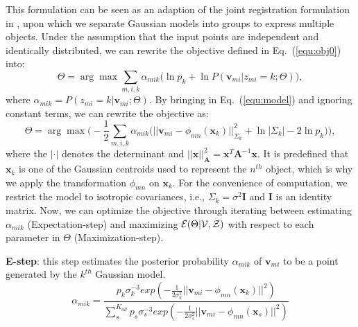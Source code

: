 This formulation can be seen as an adaption of the joint registration formulation in \cite{Evangelidis2014}, upon which we separate Gaussian models into groups to express multiple objects. 
%
%
Under the assumption that the input points are independent and identically distributed, we can rewrite the objective defined in Eq.~(\ref{equ:obj0}) into:
%
\begin{equation} \label{equ:obj2}
\Theta=\arg\max\sum_{m,i,k}\alpha_{mik}\big(\ln p_k + \ln P(\mathbf{v}_{mi}|z_{mi}=k;\Theta)\big),
\end{equation}
%
where $\alpha_{mik} = P( z_{mi} = k | \mathbf{v}_{mi} ; \Theta )$.
%
By bringing in Eq.~(\ref{equ:model}) and ignoring constant terms, we can rewrite the objective as:
\begin{equation}
\label{equ:obj3}
\Theta=\arg\max\Big(-\frac{1}{2}\sum_{m,i,k}\alpha_{mik}\big(||\mathbf{v}_{mi}-\phi_{mn}(\mathbf{x}_k)||_{\Sigma_k}^2 + \ln |\Sigma_k| - 2\ln p_k\big)\Big), 
\end{equation}
%
where the $|\cdot|$ denotes the determinant and $||\mathbf{x}||_{\mathbf{A}}^2= \mathbf{x}^T\mathbf{A}^{-1}\mathbf{x}$. 
%
It is predefined that $\mathbf{x}_k$ is one of the Gaussian centroids used to represent the $n^{th}$ object, which is why we apply the transformation $\phi_{mn}$ on $\mathbf{x}_k$. 
%
For the convenience of computation, we restrict the model to isotropic covariances, i.e., $\Sigma_k=\sigma^2\mathbf{I}$ and $\mathbf{I}$ is an identity matrix.
%
Now, we can optimize the objective through iterating between estimating $\alpha_{mik}$ (Expectation-step) and maximizing $\mathcal{E}(\Theta|\mathcal{V},\mathcal{Z})$ with respect to each parameter in $\Theta$ (Maximization-step).

\noindent\textbf{E-step}:
this step estimates the posterior probability $\alpha_{mik}$ of $\mathbf v_{mi}$ to be a point generated by the $k^{th}$ Gaussian model.
%
\begin{equation}
\label{equ:estep}
\alpha_{mik}=\frac{p_k\sigma_k^{-3}exp(-\frac{1}{2\sigma_k^2}||\mathbf v_{mi}-\phi_{mn}(\mathbf x_k)||^2)}{\sum_s^{K_{all}}p_s\sigma_s^{-3}exp(-\frac{1}{2\sigma_s^2}||\mathbf v_{mi}-\phi_{mn}(\mathbf x_s)||^2)}
\end{equation}
%

